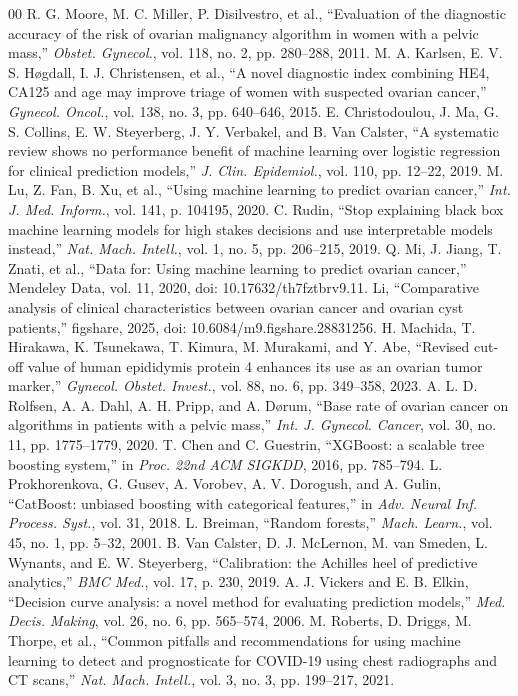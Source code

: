 \documentclass[conference]{IEEEtran}
\begin{document}
\begin{thebibliography}{00}\fontsize{6.5}{7.8}\selectfont
\setlength{\itemsep}{0pt}\setlength{\parsep}{0pt}
 R. G. Moore, M. C. Miller, P. Disilvestro, et al.,
``Evaluation of the diagnostic accuracy of the risk of ovarian malignancy
algorithm in women with a pelvic mass,'' \emph{Obstet. Gynecol.}, vol. 118,
no. 2, pp. 280--288, 2011.
 M. A. Karlsen, E. V. S. H{\o}gdall, I. J. Christensen,
et al., ``A novel diagnostic index combining HE4, CA125 and age may improve
triage of women with suspected ovarian cancer,'' \emph{Gynecol. Oncol.},
vol. 138, no. 3, pp. 640--646, 2015.
 E. Christodoulou, J. Ma, G. S. Collins,
E. W. Steyerberg, J. Y. Verbakel, and B. Van Calster, ``A systematic review
shows no performance benefit of machine learning over logistic regression
for clinical prediction models,'' \emph{J. Clin. Epidemiol.}, vol. 110,
pp. 12--22, 2019.
 M. Lu, Z. Fan, B. Xu, et al., ``Using machine learning
to predict ovarian cancer,'' \emph{Int. J. Med. Inform.}, vol. 141,
p. 104195, 2020.
 C. Rudin, ``Stop explaining black box machine learning
models for high stakes decisions and use interpretable models instead,''
\emph{Nat. Mach. Intell.}, vol. 1, no. 5, pp. 206--215, 2019.
 Q. Mi, J. Jiang, T. Znati, et al., ``Data for: Using
machine learning to predict ovarian cancer,'' Mendeley Data, vol. 11,
2020, doi: 10.17632/th7fztbrv9.11.
 Li, ``Comparative analysis of clinical characteristics
between ovarian cancer and ovarian cyst patients,'' figshare, 2025,
doi: 10.6084/m9.figshare.28831256.
 H. Machida, T. Hirakawa, K. Tsunekawa,
T. Kimura, M. Murakami, and Y. Abe, ``Revised cut-off value of human
epididymis protein 4 enhances its use as an ovarian tumor marker,''
\emph{Gynecol. Obstet. Invest.}, vol. 88, no. 6, pp. 349--358, 2023.
 A. L. D. Rolfsen, A. A. Dahl, A. H. Pripp, and
A. D{\o}rum, ``Base rate of ovarian cancer on algorithms in patients with
a pelvic mass,'' \emph{Int. J. Gynecol. Cancer}, vol. 30, no. 11, pp.
1775--1779, 2020.
 T. Chen and C. Guestrin, ``XGBoost: a scalable tree
boosting system,'' in \emph{Proc. 22nd ACM SIGKDD}, 2016, pp. 785--794.
 L. Prokhorenkova, G. Gusev, A. Vorobev,
A. V. Dorogush, and A. Gulin, ``CatBoost: unbiased boosting with
categorical features,'' in \emph{Adv. Neural Inf. Process. Syst.},
vol. 31, 2018.
 L. Breiman, ``Random forests,'' \emph{Mach. Learn.},
vol. 45, no. 1, pp. 5--32, 2001.
 B. Van Calster, D. J. McLernon, M. van Smeden,
L. Wynants, and E. W. Steyerberg, ``Calibration: the Achilles heel of
predictive analytics,'' \emph{BMC Med.}, vol. 17, p. 230, 2019.
 A. J. Vickers and E. B. Elkin, ``Decision curve
analysis: a novel method for evaluating prediction models,'' \emph{Med.
Decis. Making}, vol. 26, no. 6, pp. 565--574, 2006.
 M. Roberts, D. Driggs, M. Thorpe, et al., ``Common
pitfalls and recommendations for using machine learning to detect and
prognosticate for COVID-19 using chest radiographs and CT scans,''
\emph{Nat. Mach. Intell.}, vol. 3, no. 3, pp. 199--217, 2021.
\end{thebibliography}
\end{document}
